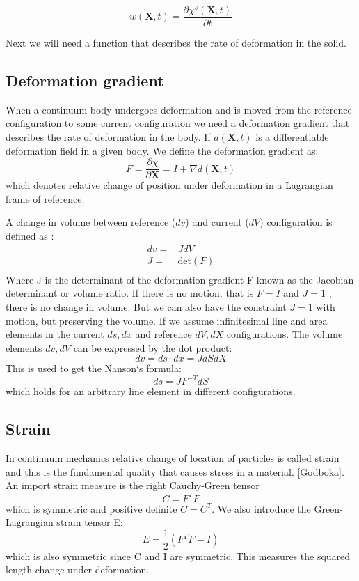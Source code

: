 $$  w(\textbf{X},t) = \frac{\partial \chi^s(\textbf{X},t)}{\partial t}   $$



Next we will need a function that describes the rate of deformation in the solid.
\subsection*{Deformation gradient}
When a continuum body undergoes deformation and is moved from the reference configuration to some current configuration we need a deformation gradient that describes the rate of deformation in the body. 
If $d(\textbf{X},t)$ is a differentiable deformation field in a given body. We define the deformation gradient as:  
$$F = \frac{\partial \chi}{\partial \textbf{X}} = I + \nabla d(\textbf{X},t)$$ 
which denotes relative change of position under deformation in a Lagrangian frame of reference.

A change in volume between reference ($dv$) and current ($dV$) configuration is defined as :
\begin{align*}
dv =& J dV\\
J =& \text{det}(F)\\
\end{align*}
Where J is the determinant of the deformation gradient F known as the Jacobian determinant or volume ratio. If there is no motion, that is $ F = I$ and $J=1$ , there is no change in volume. But we can also have the constraint $J=1$ with motion, but preserving the volume.\newline
If we assume infinitesimal line and area elements in the current $ds, dx$ and reference $dV,dX$ configurations. The volume elements $dv, dV$ can be expressed by the dot product:
$$ dv = ds\cdot dx = J dS dX$$
This is used to get the Nanson`s formula:
$$ ds = JF^{-T}dS$$
which holds for an arbitrary line element in different configurations.

\subsection*{Strain}
In continuum mechanics relative change of location of particles is called strain and this is the fundamental quality that causes stress in a material. [Godboka]. An import strain measure is the right Cauchy-Green tensor 
$$C = F^TF$$ 
which is symmetric and positive definite $C = C^T$.  We also introduce the Green-Lagrangian strain tensor E:
$$E = \frac{1}{2}(F^TF -I) $$
which is also symmetric since C and I are symmetric. This measures the squared length change under deformation.
		
